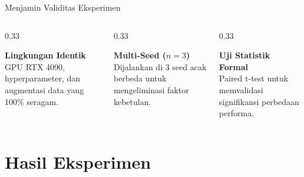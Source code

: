 \documentclass[aspectratio=169,10pt]{beamer}
\begin{document}
\begin{frame}{Menjamin Validitas Eksperimen}
    \begin{columns}
        \begin{column}{0.33\textwidth}
            \centering
            \scalebox{2.5}{\color{secondary}\checkmark}
            \vspace{0.5em}
            
            \textbf{Lingkungan Identik}\\
            \small GPU RTX 4090, hyperparameter, dan augmentasi data yang 100\% seragam.
        \end{column}
        \begin{column}{0.33\textwidth}
            \centering
            \scalebox{2.5}{\color{secondary}\checkmark}
            \vspace{0.5em}
            
            \textbf{Multi-Seed ($n=3$)}\\
            \small Dijalankan di 3 seed acak berbeda untuk mengeliminasi faktor kebetulan.
        \end{column}
        \begin{column}{0.33\textwidth}
            \centering
            \scalebox{2.5}{\color{secondary}\checkmark}
            \vspace{0.5em}
            
            \textbf{Uji Statistik Formal}\\
            \small Paired t-test untuk memvalidasi signifikansi perbedaan performa.
        \end{column}
    \end{columns}
\end{frame}

\section{Hasil Eksperimen}
\end{document}
